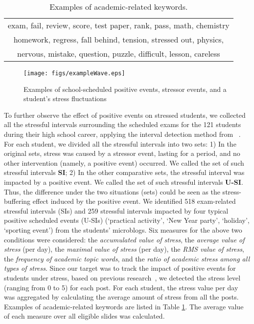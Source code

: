 \documentclass[5p,times,numbers,authoryear]{elsarticle}
\begin{document}
\begin{table}[h]
\centering
\caption{\small{Examples of academic-related keywords.}}
\label{tab:studyWords}
\small{
\begin{tabular}{c}
\toprule
exam, fail, review, score, test paper, rank, pass, math, chemistry\\
homework, regress, fall behind, tension, stressed out, physics,\\
nervous, mistake, question, puzzle, difficult, lesson, careless\\
\bottomrule
\end{tabular}
}
\end{table}


\begin{figure}[H]
\centering
\texttt{[image: figs/exampleWave.eps]}
\caption{\small{Examples of school-scheduled positive events, stressor events, and a student's stress fluctuations}}
\label{fig:example}
\end{figure}

To further observe the effect of positive events on stressed students,
we collected all the stressful intervals surrounding the scheduled exams for the 121 students during their high school career, applying the interval detection method from ~\citep{Li2017Analyzing}.
For each student, we divided all the stressful intervals into two sets:
1) In the original sets, stress was caused by a stressor event, lasting for a period,
and no other intervention (namely, a positive event) occurred.
We called the set of such stressful intervals \textbf{SI};
2) In the other comparative sets, the stressful interval was impacted by a positive event.
We called the set of such stressful intervals \textbf{U-SI}.
Thus, the difference under the two situations (sets) could be seen as the stress-buffering effect
induced by the positive event.
We identified 518 exam-related stressful intervals (SIs)
and 259 stressful intervals impacted by four typical positive scheduled events (U-SIs)
(`practical activity', `New Year party', `holiday', `sporting event') from the students' microblogs.
Six measures for the above two conditions were considered:
the \emph{accumulated value of stress}, the \emph{average value of stress} (per day),  the \emph{maximal value of stress} (per day), the \emph{RMS value of stress},
the \emph{frequency of academic topic words}, and the \emph{ratio of academic stress among all types of stress}.
Since our target was to track the impact of positive events for students under stress,
based on previous research~\cite{XueUbicomp13}, we detected the stress level (ranging from 0 to 5) for each post.
For each student, the stress value per day was aggregated by calculating the average amount of stress from all the posts.
Examples of academic-related keywords are listed in Table \ref{tab:studyWords}.
The average value of each measure over all eligible slides was calculated.
\end{document}
